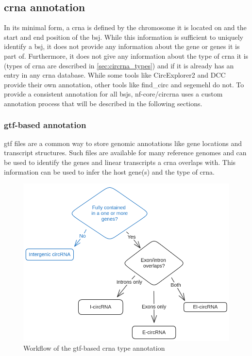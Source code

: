 \subsection{\gls{crna} annotation}
In its minimal form, a \gls{crna} is defined by the chromosome it is located on
and the start and end position of the \gls{bsj}.
While this information is sufficient to uniquely identify a \gls{bsj}, it does
not provide any information about the gene or genes it is part of.
Furthermore, it does not give any information about the type of \gls{crna} it
is (types of \gls{crna} are described in \cref{sec:circrna_types}) and if it is
already has an entry in any \gls{crna} database.
While some tools like CircExplorer2 and DCC provide their own annotation, other
tools like find\_circ and segemehl do not.
To provide a consistent annotation for all \glspl{bsj}, nf-core/circrna uses a
custom annotation process that will be described in the following sections.

\subsubsection{\gls{gtf}-based annotation}
\label{sec:gtf_annotation}
\gls{gtf} files are a common way to store genomic annotations like gene
locations and
transcript structures.
Such files are available for many reference genomes and can be used to identify
the genes and linear transcripts a \gls{crna} overlaps with.
This information can be used to infer the host gene(s) and the type of
\gls{crna}.

\begin{figure}[ht]
      \centering

      \includegraphics[width=\textwidth]{chapters/3_materials_and_methods/figures/annotation.png}
      \caption{Workflow of the \gls{gtf}-based \gls{crna} type annotation}
      \label{fig:gtf_annotation}
\end{figure}

